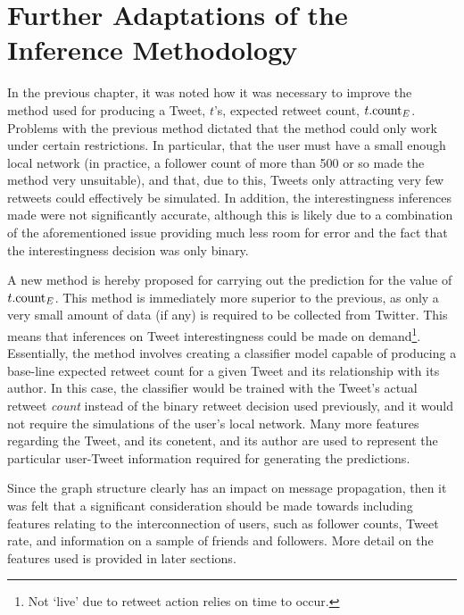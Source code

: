 \section{Further Adaptations of the Inference Methodology}
In the previous chapter, it was noted how it was necessary to improve the method used for producing a Tweet, $t$'s, expected retweet count, $t.\textrm{count}_E$. Problems with the previous method dictated that the method could only work under certain restrictions. In particular, that the user must have a small enough local network (in practice, a follower count of more than 500 or so made the method very unsuitable), and that, due to this, Tweets only attracting very few retweets could effectively be simulated. In addition, the interestingness inferences made were not significantly accurate, although this is likely due to a combination of the aforementioned issue providing much less room for error and the fact that the interestingness decision was only binary.

A new method is hereby proposed for carrying out the prediction for the value of $t.\textrm{count}_E$. This method is immediately more superior to the previous, as only a very small amount of data (if any) is required to be collected from Twitter. This means that inferences on Tweet interestingness could be made on demand\footnote{Not `live' due to retweet action relies on time to occur.}.\\
Essentially, the method involves creating a classifier model capable of producing a base-line expected retweet count for a given Tweet and its relationship with its author. In this case, the classifier would be trained with the Tweet's actual retweet \textit{count} instead of the binary retweet decision used previously, and it would not require the simulations of the user's local network. Many more features regarding the Tweet, and its conetent, and its author are used to represent the particular user-Tweet information required for generating the predictions.

Since the graph structure clearly has an impact on message propagation, then it was felt that a significant consideration should be made towards including features relating to the interconnection of users, such as follower counts, Tweet rate, and information on a sample of friends and followers. More detail on the features used is provided in later sections.

